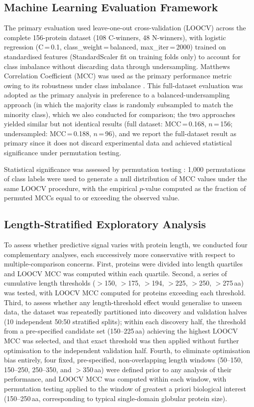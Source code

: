 \documentclass[unnumsec,webpdf,contemporary,large]{oup-authoring-template}
\begin{document}
\subsection{Machine Learning Evaluation Framework}
The primary evaluation used leave-one-out cross-validation (LOOCV) across the complete 156-protein dataset (108 C-winners, 48 N-winners), with logistic regression (C\,=\,0.1, class\_weight\,=\,balanced, max\_iter\,=\,2000) trained on standardised features (StandardScaler fit on training folds only) to account for class imbalance without discarding data through undersampling. Matthews Correlation Coefficient (MCC) was used as the primary performance metric owing to its robustness under class imbalance \citep{chicco2020}. This full-dataset evaluation was adopted as the primary analysis in preference to a balanced-undersampling approach (in which the majority class is randomly subsampled to match the minority class), which we also conducted for comparison; the two approaches yielded similar but not identical results (full dataset: MCC\,=\,0.168, $n$\,=\,156; undersampled: MCC\,=\,0.188, $n$\,=\,96), and we report the full-dataset result as primary since it does not discard experimental data and achieved statistical significance under permutation testing.

Statistical significance was assessed by permutation testing \citep{ojala2010}: 1,000 permutations of class labels were used to generate a null distribution of MCC values under the same LOOCV procedure, with the empirical $p$-value computed as the fraction of permuted MCCs equal to or exceeding the observed value.

\subsection{Length-Stratified Exploratory Analysis}
To assess whether predictive signal varies with protein length, we conducted four complementary analyses, each successively more conservative with respect to multiple-comparison concerns. First, proteins were divided into length quartiles and LOOCV MCC was computed within each quartile. Second, a series of cumulative length thresholds ($>$150, $>$175, $>$194, $>$225, $>$250, $>$275\,aa) was tested, with LOOCV MCC computed for proteins exceeding each threshold. Third, to assess whether any length-threshold effect would generalise to unseen data, the dataset was repeatedly partitioned into discovery and validation halves (10 independent 50:50 stratified splits); within each discovery half, the threshold from a pre-specified candidate set (150--225\,aa) achieving the highest LOOCV MCC was selected, and that exact threshold was then applied without further optimisation to the independent validation half. Fourth, to eliminate optimisation bias entirely, four fixed, pre-specified, non-overlapping length windows (50--150, 150--250, 250--350, and $>$350\,aa) were defined prior to any analysis of their performance, and LOOCV MCC was computed within each window, with permutation testing applied to the window of greatest a priori biological interest (150--250\,aa, corresponding to typical single-domain globular protein size).
\end{document}
